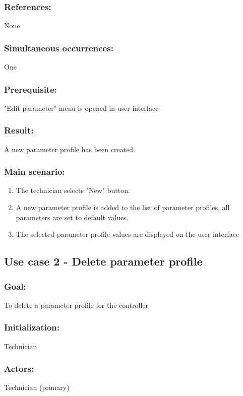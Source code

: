 \subsubsection*{References:}
None

\subsubsection*{Simultaneous occurrences:}
One

\subsubsection*{Prerequisite:}
"Edit parameter" menu is opened in user interface

\subsubsection*{Result:}
A new parameter profile has been created.

\subsubsection*{Main scenario:}
\begin{enumerate}
	\item The technician selects "New" button.
	\item A new parameter profile is added to the list of parameter profiles, all parameters are set to default values.
	\item The selected parameter profile values are displayed on the user interface
\end{enumerate}	


\subsection{Use case 2 - Delete parameter profile}
\subsubsection*{Goal:}
To delete a parameter profile for the controller

\subsubsection*{Initialization:}
Technician

\subsubsection*{Actors:}
Technician (primary)

